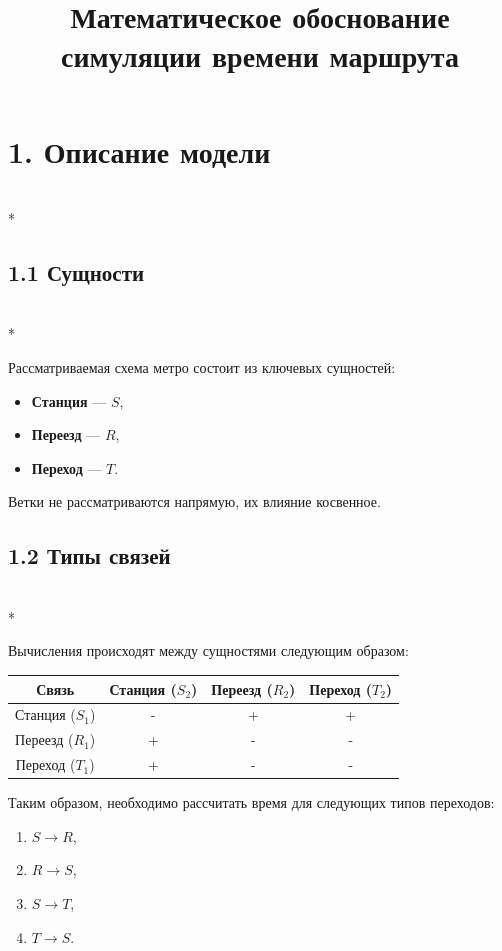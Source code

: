 \documentclass[12pt]{article}
\title{Математическое обоснование симуляции времени маршрута}
\author{}
\date{}
\begin{document}
\maketitle

\section*{1. Описание модели}\mbox{}\\*

\subsection*{1.1 Сущности}\mbox{}\\*

Рассматриваемая схема метро состоит из ключевых сущностей:

\begin{itemize}
  \item \textbf{Станция} — $S$,
  \item \textbf{Переезд} — $R$,
  \item \textbf{Переход} — $T$.
\end{itemize}

Ветки не рассматриваются напрямую, их влияние косвенное.

\subsection*{1.2 Типы связей}\mbox{}\\*

Вычисления происходят между сущностями следующим образом:

\begin{table}[h]
\centering
\begin{tabular}{|c|c|c|c|}
\hline
Связь & Станция ($S_2$) & Переезд ($R_2$) & Переход ($T_2$) \\
\hline
Станция ($S_1$) & - & + & + \\
\hline
Переезд ($R_1$) & + & - & - \\
\hline
Переход ($T_1$) & + & - & - \\
\hline
\end{tabular}
\end{table}

Таким образом, необходимо рассчитать время для следующих типов переходов:

\begin{enumerate}
  \item $S \to R$,
  \item $R \to S$,
  \item $S \to T$,
  \item $T \to S$.
\end{enumerate}
\end{document}
